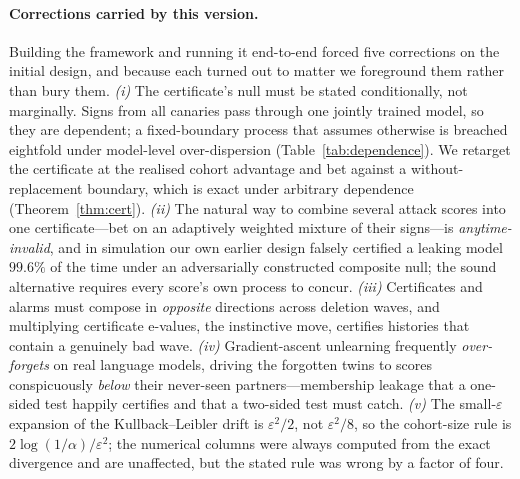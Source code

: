 \documentclass[pdflatex,sn-mathphys-num]{sn-jnl}
\theoremstyle{thmstyleone}
\theoremstyle{thmstyletwo}
\theoremstyle{thmstylethree}
\newcommand{\eps}{\varepsilon}
\begin{document}
\paragraph{Corrections carried by this version.} Building the framework and running it
end-to-end forced five corrections on the initial design, and because each turned out
to matter we foreground them rather than bury them. \emph{(i)} The certificate's null
must be stated conditionally, not marginally. Signs from all canaries pass through one
jointly trained model, so they are dependent; a fixed-boundary process that assumes
otherwise is breached eightfold under model-level over-dispersion
(Table~\ref{tab:dependence}). We retarget the certificate at the realised cohort
advantage and bet against a without-replacement boundary, which is exact under
arbitrary dependence (Theorem~\ref{thm:cert}). \emph{(ii)} The natural way to combine
several attack scores into one certificate---bet on an adaptively weighted mixture of
their signs---is \emph{anytime-invalid}, and in simulation our own earlier design
falsely certified a leaking model $99.6\%$ of the time under an adversarially
constructed composite null; the sound alternative requires every score's own process
to concur. \emph{(iii)} Certificates and alarms must compose
in \emph{opposite} directions across deletion waves, and multiplying certificate
e-values, the instinctive move, certifies histories that contain a genuinely bad wave.
\emph{(iv)} Gradient-ascent unlearning frequently \emph{over-forgets} on real language
models, driving the forgotten twins to scores conspicuously \emph{below} their
never-seen partners---membership leakage that a one-sided test happily certifies and
that a two-sided test must catch. \emph{(v)} The small-$\eps$ expansion of the
Kullback--Leibler drift is $\eps^2/2$, not $\eps^2/8$, so the cohort-size rule is
$2\log(1/\alpha)/\eps^2$; the numerical columns were always computed from the exact
divergence and are unaffected, but the stated rule was wrong by a factor of four.
\end{document}
